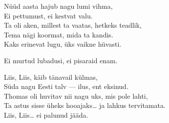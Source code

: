 \begin{lyrics}
Nüüd aasta hajub nagu lumi vihma,\\
Ei pettumust, ei kestvat valu.\\
Ta oli aken, millest ta vaatas, hetkeks teadlik,\\
Tema nägi koormat, mida ta kandis.\\
Kaks erinevat lugu, üks vaikne hüvasti.

Ei murtud lubadusi, ei pisaraid enam.

Liis, Liis, käib tänavail külmas,\\
Süda nagu Eesti talv — ilus, ent eksinud.\\
Thomas oli huvitav nii nagu uks, mis pole lahti,\\
Ta astus sisse üheks hooajaks… ja lahkus tervitamata.\\
Liis, Liis… ei palunud jääda.
\end{lyrics}

